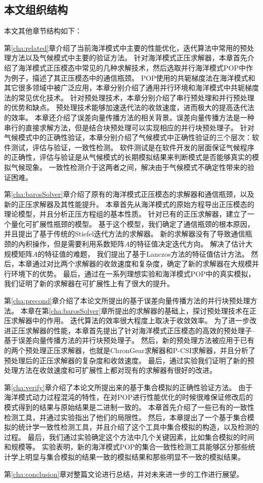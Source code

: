 \subsection{本文组织结构}
本文其他章节结构如下：

第\ref{cha:related}章介绍了当前海洋模式中主要的性能优化，迭代算法中常用的预处理方法以及气候模式中主要的验证方法。
针对海洋模式正压求解器，本章首先介绍了海洋模式正压模态中常见的几种求解技术，然后选取并行海洋模式POP中作为例子，描述了其正压模态中的通信瓶颈。 
POP使用的共轭梯度法在海洋模式和其它很多领域中被广泛应用，本章分别介绍了通用并行环境和海洋模式中共轭梯度法的常见优化技术。
针对预处理技术，本章分别介绍了串行预处理和并行预处理的优势和缺点。
预处理技术能够加速迭代法的收敛速度，进而极大的提高迭代法的效率。
本章还介绍了误差向量传播方法的相关背景。误差向量传播方法是一种串行的直接求解方法，但是结合块预处理可以实现相应的并行块预处理子。
针对气候模式中的正确性验证，本章分别介绍了气候模式中正确性验证的三个层次：软件测试，评估与验证，一致性检测。
软件测试是在软件开发的层面保证气候程序的正确性，评估与验证是从气候模式的长期模拟结果来判断模式是否能够真实的模拟气候现象。
一致性检测介于这两者之间，解决由于气候模式不确定性带来的验证困难。


第\ref{cha:barosSolver}章介绍了原有的海洋模式正压模态的求解器和通信瓶颈，以及新的正压求解器及其性能提升。 
本章首先从海洋模式的原始方程导出正压模态的理论模型，并且分析正压方程组的基本性质。
针对已有的正压求解器，建立了一个量化可扩展性瓶颈的模型。
基于这个模型，我们确定了通信瓶颈的根本原因，并且提出了基于传统的Stiefel迭代方法的求解器。 
新的求解器没有了导致通信瓶颈的內积操作，但是需要利用系数矩阵$A$的特征值决定迭代方向。 
解决了估计大规模矩阵$A$的特征值的难题， 我们提出了基于Lanczos方法的特征值估计方法。 
然后，本章通过对比两个求解器的收敛速度和复杂度，确定了新的求解器在大规模并行环境下的优势。
最后，通过在一系列理想实验和海洋模式POP中的真实模拟，我们证明了新的求解器在可扩展性上有了很大的提升。 



第\ref{cha:precond}章介绍了本论文所提出的基于误差向量传播方法的并行块预处理方法。
本章在第\ref{cha:barosSolver}章所提出的求解器的基础上，探讨预处理技术在正压求解器中的作用。
迭代算法的效率很大程度上取决于收敛效率。
为了进一步改进正压求解器的性能，本章首先提出了针对海洋模式正压模态的高效的预处理子--基于误差向量传播方法的并行块预处理子。
然后，新的预处理方法被应用于已有的两个预处理正压求解器，也就是ChronGear求解器和P-CSI求解器，并且分析了预处理后的正压求解器的复杂度和收敛速度。
最后，通过实验我们证明了新的预处理方法在收敛速度和可扩展性上都对现有的求解器有很好的改进。

第\ref{cha:verify}章介绍了本论文所提出来的基于集合模拟的正确性验证方法。  
由于海洋模式动力过程混沌的特性，在对POP进行性能优化的时候很难保证修改后的模式得到的结果与原始结果是二进制一致的。 
本章首先介绍了一些已有的一致性检测工具，并通过实验指出了他们的局限性。
然后，本章提出了一个基于集合模拟的统计学一致性检测工具，并且介绍了这个工具中集合模拟的构造，以及检测的过程。
最后，我们通过实验确定这个方法中几个关键因素，比如集合模拟的时间和规模等。
实验表明，新的海洋模式POP的集合一致性检测工具能够区分那些统计学上明显与集合模拟的结果一致的模拟结果和那些明显不一致的模拟结果。 


第\ref{cha:conclusion}章对整篇文论进行总结，并对未来进一步的工作进行展望。


